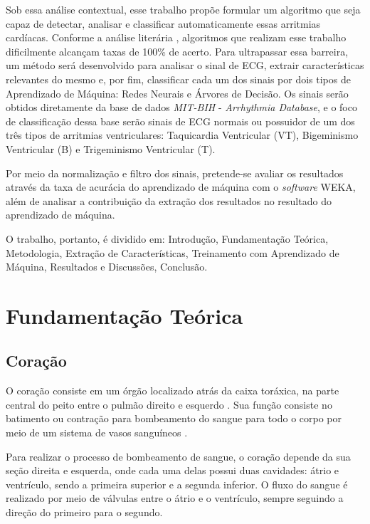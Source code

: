 \documentclass[conference]{IEEEtran}
\begin{document}
Sob essa análise contextual, esse trabalho propõe formular um algoritmo que seja capaz de detectar, analisar e classificar automaticamente essas arritmias cardíacas. Conforme a análise literária \cite{beckert09}, algoritmos que realizam esse trabalho dificilmente alcançam taxas de 100\% de acerto. Para ultrapassar essa barreira, um método será desenvolvido para analisar o sinal de ECG, extrair características relevantes do mesmo e, por fim, classificar cada um dos sinais por dois tipos de Aprendizado de Máquina: Redes Neurais e Árvores de Decisão. Os sinais serão obtidos diretamente da base de dados \textit{MIT-BIH} - \textit{Arrhythmia Database}, e o foco de classificação dessa base serão sinais de ECG normais ou possuidor de um dos três tipos de arritmias ventriculares: Taquicardia Ventricular (VT), Bigeminismo Ventricular (B) e Trigeminismo Ventricular (T).

Por meio da normalização e filtro dos sinais, pretende-se avaliar os resultados através da taxa de acurácia do aprendizado de máquina com o \textit{software} WEKA, além de analisar a contribuição da extração dos resultados no resultado do aprendizado de máquina. 

O trabalho, portanto, é dividido em: Introdução, Fundamentação Teórica, Metodologia, Extração de Características, Treinamento com Aprendizado de Máquina, Resultados e Discussões, Conclusão.

 

\section{Fundamentação Teórica}

\subsection{Coração}

O coração consiste em um órgão localizado atrás da caixa toráxica, na parte central do peito entre o pulmão direito e esquerdo \cite{nih11}. Sua função consiste no batimento ou contração para bombeamento do sangue para todo o corpo por meio de um sistema de vasos sanguíneos \cite{gray79}.

Para realizar o processo de bombeamento de sangue, o coração depende da sua seção direita e esquerda, onde cada uma delas possui duas cavidades: átrio e ventrículo, sendo a primeira superior e a segunda inferior. O fluxo do sangue é realizado por meio de válvulas entre o átrio e o ventrículo, sempre seguindo a direção do primeiro para o segundo.
\end{document}
